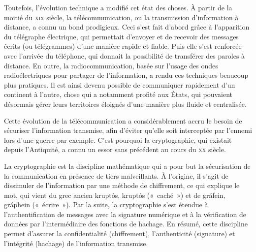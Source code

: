 Toutefois, l'évolution technique a modifié cet état des choses. À partir de la moitié du \textsc{xix}\ieme{} siècle, la télécommunication, ou la transmission d'information à distance, a connu un bond prodigieux. Ceci s'est fait d'abord grâce à l'apparition du télégraphe électrique, qui permettait d'envoyer et de recevoir des messages écrits (ou télégrammes) d'une manière rapide et fiable. Puis elle s'est renforcée avec l'arrivée du téléphone, qui donnait la possibilité de transférer des paroles à distance. En outre, la radiocommunication, basée sur l'usage des ondes radioélectriques pour partager de l'information, a rendu ces techniques beaucoup plus pratiques. Il est ainsi devenu possible de communiquer rapidement d'un continent à l'autre, chose qui a notamment profité aux États, qui pouvaient désormais gérer leurs territoires éloignés d'une manière plus fluide et centralisée. %

\clearpage
Cette évolution de la télécommunication a considérablement accru le besoin de sécuriser l'information transmise, afin d'éviter qu'elle soit interceptée par l'ennemi lors d'une guerre par exemple. C'est pourquoi la cryptographie, qui existait depuis l'Antiquité, a connu un essor sans précédent au cours du \textsc{xx}\ieme{} siècle.


La cryptographie est la discipline mathématique qui a pour but la sécurisation de la communication en présence de tiers malveillants. À l'origine, il s'agit de dissimuler de l'information par une méthode de chiffrement, ce qui explique le mot, qui vient du grec ancien \foreignlanguage{greek}{kruptós}, kruptós («~caché~») et de \foreignlanguage{greek}{gráfein}, gráphein («~écrire~»). Par la suite, la cryptographie s'est étendue à l'authentification de messages avec la signature numérique et à la vérification de données par l'intermédiaire des fonctions de hachage. En résumé, cette discipline permet d'assurer la confidentialité (chiffrement), l'authenticité (signature) et l'intégrité (hachage) de l'information transmise.


